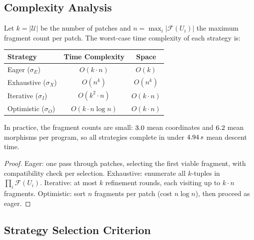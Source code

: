\documentclass[11pt]{article}
\newcommand{\FragmentSpace}{\mathcal{F}}
\begin{document}
\subsection{Complexity Analysis}

\begin{proposition}\label{prop:strategy-complexity}
Let $k = |\mathcal{U}|$ be the number of patches and
$n = \max_i |\FragmentSpace(U_i)|$ the maximum fragment count per
patch.  The worst-case time complexity of each strategy is:
\begin{center}
\begin{tabular}{lcc}
\toprule
\textbf{Strategy} & \textbf{Time Complexity} & \textbf{Space} \\
\midrule
Eager ($\sigma_E$) & $O(k \cdot n)$ & $O(k)$ \\
Exhaustive ($\sigma_X$) & $O(n^k)$ & $O(n^k)$ \\
Iterative ($\sigma_I$) & $O(k^2 \cdot n)$ & $O(k \cdot n)$ \\
Optimistic ($\sigma_O$) & $O(k \cdot n \log n)$ & $O(k \cdot n)$ \\
\bottomrule
\end{tabular}
\end{center}
In practice, the fragment counts are small: $3.0$ mean
coordinates and $6.2$ mean morphisms per program,
so all strategies complete in under $4.94\,s$ mean
descent time.
\end{proposition}

\begin{proof}
Eager: one pass through patches, selecting the first viable fragment,
with compatibility check per selection.  Exhaustive: enumerate all
$k$-tuples in $\prod_i \FragmentSpace(U_i)$.  Iterative: at most
$k$ refinement rounds, each visiting up to $k \cdot n$ fragments.
Optimistic: sort $n$ fragments per patch (cost $n \log n$), then
proceed as eager.
\end{proof}

\subsection{Strategy Selection Criterion}
\end{document}
